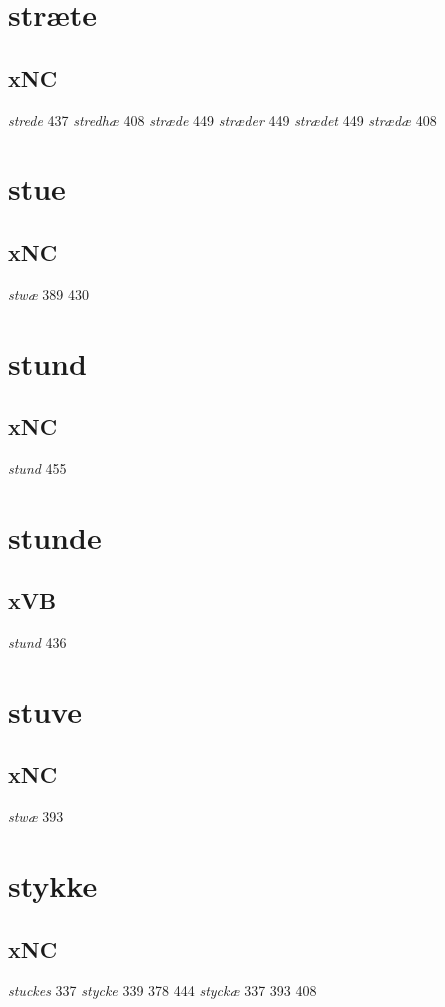 \documentclass[a4paper,twocolumn]{article}
\begin{document}
\section{stræte}
\label{sec:org350012a}
\subsection{xNC}
\label{sec:org68aec4b}
\emph{strede} 437 \emph{stredhæ} 408 \emph{stræde} 449 \emph{stræder} 449 \emph{strædet} 449 \emph{strædæ} 408 
\section{stue}
\label{sec:org2474c2e}
\subsection{xNC}
\label{sec:org509a831}
\emph{stwæ} 389 430 
\section{stund}
\label{sec:orgb7d8108}
\subsection{xNC}
\label{sec:org71f9411}
\emph{stund} 455 
\section{stunde}
\label{sec:org15e9acb}
\subsection{xVB}
\label{sec:org8cc30ff}
\emph{stund} 436 
\section{stuve}
\label{sec:orgcd3eb57}
\subsection{xNC}
\label{sec:org0c61602}
\emph{stwæ} 393 
\section{stykke}
\label{sec:org5cdc532}
\subsection{xNC}
\label{sec:org7d8b986}
\emph{stuckes} 337 \emph{stycke} 339 378 444 \emph{styckæ} 337 393 408 
\end{document}
